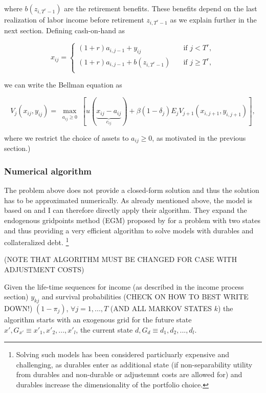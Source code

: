\documentclass[a4paper,12pt]{article}
\begin{document}
where $b(z_{i,T^{r}-1})$ are the retirement benefits. These benefits depend on the last realization of labor income before retirement $z_{i,T^{r}-1}$ as we explain further in the next section. Defining cash-on-hand as 

\begin{equation}
x_{ij} = 
  \begin{cases}
    (1+r)a_{i,j-1}+y_{ij} & \quad \text{if } j < T^{r}, \\
    (1+r)a_{i,j-1}+b(z_{i,T^{r}-1}) & \quad \text{if } j \geq T^{r},\\
  \end{cases}
\end{equation}

we can write the Bellman equation as 

\begin{equation}
V_{j}(x_{ij},y_{ij})= \max_{ \substack{a_{ij} \geq 0}}[u(\underbrace{x_{ij}-a_{ij}}_{c_{ij}}) + \beta(1-\delta_{j})E_{j}V_{j+1}(x_{i,j+1},y_{i,j+1})],
\end{equation}

where we restrict the choice of assets to $a_{ij} \geq 0$, as motivated in the previous section.)

\subsubsection{Numerical algorithm}

The problem above does not provide a closed-form solution and thus the solution has to be approximated numerically. As already mentioned above, the model is based on \cite{hintermaier2010} and I can therefore directly apply their algorithm. They expand the endogenous gridpoints method (EGM) proposed by \cite{carroll2006} for a problem with two states and thus providing a very efficient algorithm to solve models with durables and collateralized debt. \footnote{Solving such models has been considered particluarly expensive and challenging, as durables enter as additional state (if non-separability utility from durables and non-durable or adjustemnt costs are allowed for) and durables increase the dimensionality of the portfolio choice.\citep{hintermaier2010}} 

(NOTE THAT ALGORITHM MUST BE CHANGED FOR CASE WITH ADJUSTMENT COSTS)

Given the life-time sequences for income (as described in the income process section) {$y_{kj}$} and survival probabilities (CHECK ON HOW TO BEST WRITE DOWN!) {$(1-\pi_{j})$}, $\forall j = 1,...,T $ (AND ALL MARKOV STATES $k$) the algorithm starts with an exogenous grid for the future state $x', G_{x'} \equiv {x'_{1},x'_{2},...,x'_{l}}$, the current state $d, G_{d} \equiv {d_{1},d_{2},...,d_{l}}$.
\end{document}
